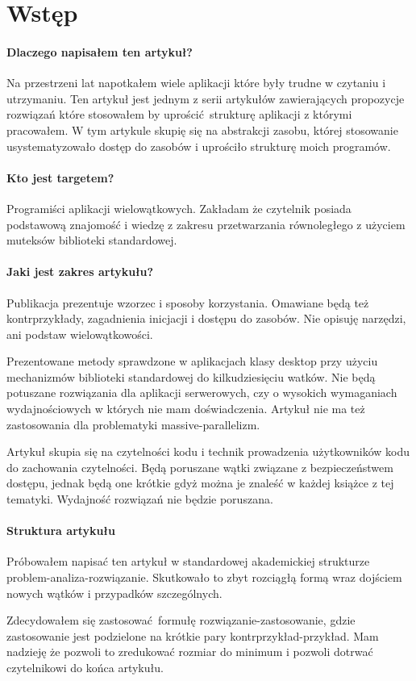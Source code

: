 \section{Wstęp}\label{sec:introduction}
\paragraph{Dlaczego napisałem ten artykuł?}
Na przestrzeni lat napotkałem wiele aplikacji które były trudne w czytaniu i utrzymaniu. Ten artykuł jest jednym z serii artykułów zawierających propozycje rozwiązań które stosowałem by uprościć strukturę aplikacji z którymi pracowałem.
W tym artykule skupię się na abstrakcji zasobu, której stosowanie usystematyzowało dostęp do zasobów i uprościło strukturę moich programów.

\paragraph{Kto jest targetem?}
Programiści \Cpp{} aplikacji wielowątkowych. Zakładam że czytelnik posiada podstawową znajomość  i wiedzę z zakresu przetwarzania równoległego z użyciem muteksów biblioteki standardowej.

\paragraph{Jaki jest zakres artykułu?}
Publikacja prezentuje wzorzec  i sposoby korzystania. Omawiane będą też kontrprzykłady, zagadnienia inicjacji i dostępu do zasobów.  Nie opisuję narzędzi, ani podstaw wielowątkowości.

Prezentowane metody sprawdzone w aplikacjach klasy desktop przy użyciu mechanizmów biblioteki standardowej do kilkudziesięciu watków. Nie będą potuszane rozwiązania dla aplikacji serwerowych, czy o wysokich wymaganiach wydajnościowych w których nie mam doświadczenia. Artykuł nie ma też zastosowania dla problematyki massive-parallelizm.

Artykuł skupia się na czytelności kodu i technik prowadzenia użytkowników kodu do zachowania czytelności. Będą poruszane wątki związane z bezpieczeństwem dostępu, jednak będą one krótkie gdyż można je znaleść w każdej książce z tej tematyki. Wydajność rozwiązań nie będzie poruszana.

\paragraph{Struktura artykułu}
Próbowałem napisać ten artykuł w standardowej akademickiej strukturze problem-analiza-rozwiązanie. Skutkowało to zbyt rozciągłą formą wraz dojściem nowych wątków i przypadków szczególnych.

Zdecydowałem się zastosować formułę rozwiązanie-zastosowanie, gdzie zastosowanie jest podzielone na krótkie pary kontrprzykład-przykład. Mam nadzieję że pozwoli to zredukować rozmiar do minimum i pozwoli dotrwać czytelnikowi do końca artykułu.
